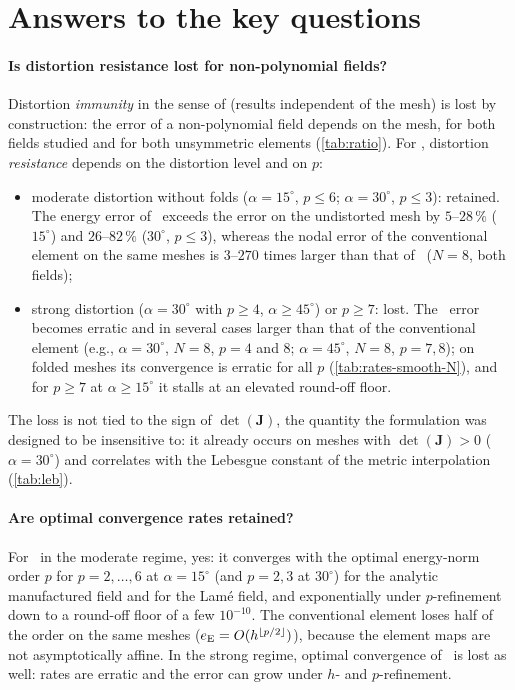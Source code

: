 \section{Answers to the key questions}\label{sec:discussion}
\paragraph{Is distortion resistance lost for non-polynomial fields?}
Distortion \emph{immunity} in the sense of \citep{Rajendran2010technique} (results
independent of the mesh) is lost by construction: the error of a non-polynomial field
depends on the mesh, for both fields studied and for both unsymmetric elements
(\cref{tab:ratio}). For \PM, distortion \emph{resistance} depends on the distortion level and on
$p$:
\begin{itemize}
\item moderate distortion without folds ($\alpha=15^\circ$, $p\le6$; $\alpha=30^\circ$, $p\le3$):
  retained. The energy error of \PM\ exceeds the error on the undistorted mesh by
  $5$--$28\,\%$ ($15^\circ$) and $26$--$82\,\%$ ($30^\circ$, $p\le3$), whereas the nodal error of the
  conventional element on the same meshes is $3$--$270$ times larger than that of \PM\ ($N=8$,
  both fields);
\item strong distortion ($\alpha=30^\circ$ with $p\ge4$, $\alpha\ge45^\circ$) or $p\ge7$: lost. The
  \PM\ error becomes erratic and in several cases larger than that of the conventional element
  (e.g., $\alpha=30^\circ$, $N=8$, $p=4$ and $8$; $\alpha=45^\circ$, $N=8$, $p=7,8$); on folded meshes its convergence
  is erratic for all $p$ (\cref{tab:rates-smooth-N}), and for $p\ge7$ at $\alpha\ge15^\circ$ it stalls at an elevated round-off
  floor.
\end{itemize}
The loss is not tied to the sign of $\det(\bm J)$, the quantity the formulation was
designed to be insensitive to: it already occurs on meshes with $\det(\bm J)>0$
($\alpha=30^\circ$) and correlates with the Lebesgue constant of the metric interpolation
(\cref{tab:leb}).

\paragraph{Are optimal convergence rates retained?}
For \PM\ in the moderate regime, yes: it converges with the optimal energy-norm order $p$ for
$p=2,\dots,6$ at $\alpha=15^\circ$ (and $p=2,3$ at $30^\circ$) for the analytic manufactured field
and for the Lam\'e field, and exponentially under $p$-refinement down to a round-off floor of
a few $10^{-10}$. The conventional element loses half of the order on the same meshes
($e_{\mathrm{E}}=O(h^{\lfloor p/2\rfloor})$), because the element maps are not asymptotically affine. In the
strong regime, optimal convergence of \PM\ is lost as well: rates are erratic and the error
can grow under $h$- and $p$-refinement.

